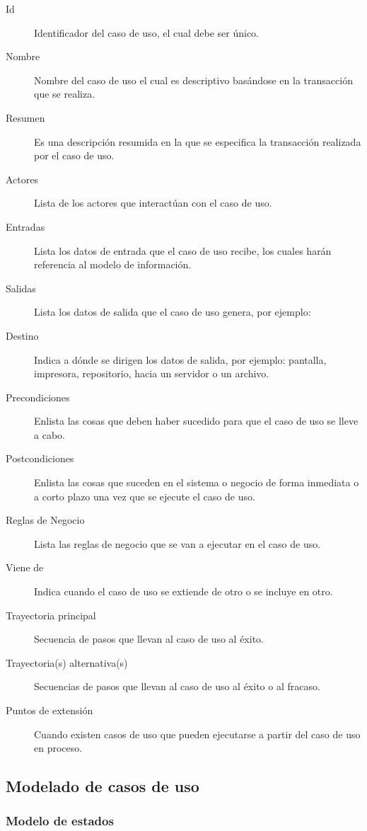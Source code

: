 \begin{description}
	\item[Id] Identificador del caso de uso, el cual debe ser único.
	\item[Nombre] Nombre del caso de uso el cual es descriptivo basándose en la transacción que se realiza.
	\item[Resumen] Es una descripción resumida en la que se especifica la transacción realizada por el caso de uso.
	\item[Actores] Lista de los actores que interactúan con el caso de uso.
	\item[Entradas] Lista los datos de entrada que el caso de uso recibe, los cuales harán referencia al modelo de información.
	\item[Salidas] Lista los datos de salida que el caso de uso genera, por ejemplo: 
	\item[Destino] Indica a dónde se dirigen los datos de salida, por ejemplo: pantalla, impresora, repositorio, hacia un servidor o un archivo.
	\item[Precondiciones] Enlista las cosas que deben haber sucedido para que el caso  de uso se lleve a cabo.
	\item[Postcondiciones] Enlista las cosas que suceden en el sistema o negocio de forma inmediata o a corto plazo una vez que se ejecute el caso de uso.
	\item[Reglas de Negocio] Lista las reglas de negocio que se van a ejecutar en el caso de uso.
	\item[Viene de] Indica cuando el caso de uso se extiende de otro o se incluye en otro.
	\item[Trayectoria principal] Secuencia de pasos que llevan al caso de uso al éxito.
	\item[Trayectoria(s) alternativa(s)] Secuencias de pasos que llevan al caso de uso al éxito o al fracaso.
	\item[Puntos de extensión] Cuando existen casos de uso que pueden ejecutarse a partir del caso de uso en proceso.
\end{description}


\subsection{Modelado de casos de uso}

\subsubsection{Modelo de estados}

